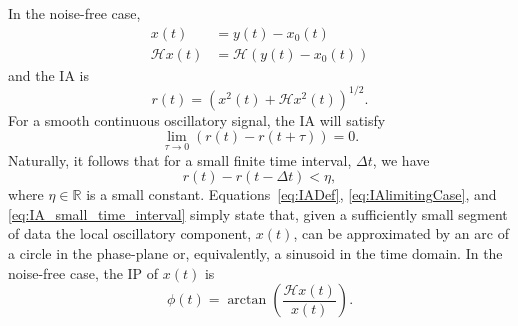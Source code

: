\documentclass[a4paper]{IEEEtran}
\begin{document}
In the noise-free case, 
\begin{align}
	x\left( t \right) &= y\left( t \right) - x_0\left( t \right) \\
	\mathcal{H}x\left( t \right) &= \mathcal{H}\left(y\left( t \right) - x_0\left( t \right)\right)
\end{align}
and the IA is
\begin{equation}\label{eq:IADef}
    r\left( t \right) = \left( x^2(t) + \mathcal{H}x^2(t)\right)^{1/2}.
\end{equation}
For a smooth continuous oscillatory signal, the IA will satisfy
\begin{equation}\label{eq:IAlimitingCase}
\mathop {\lim }\limits_{\tau  \to 0} \left( r\left( t \right) - r\left( t + \tau \right) \right) = 0.
\end{equation}
Naturally, it follows that for a small finite time interval, $\Delta t$, we have
\begin{equation}\label{eq:IA_small_time_interval}
    r(t)-r(t-\Delta t) < \eta,
\end{equation}
where $\eta \in \mathbb{R}$ is a small constant. Equations~\ref{eq:IADef}, \ref{eq:IAlimitingCase}, and \ref{eq:IA_small_time_interval} simply state that, given a sufficiently small segment of data the local oscillatory component, $x(t)$, can be approximated by an arc of a circle in the phase-plane or, equivalently, a sinusoid in the time domain. In the noise-free case, the IP of $x(t)$ is
\begin{equation}\label{IPdef}
    \phi \left( t \right) = \arctan \left( \frac{\mathcal{H}x\left( t \right)}
    {x\left( t \right)} \right).
\end{equation}
\end{document}
